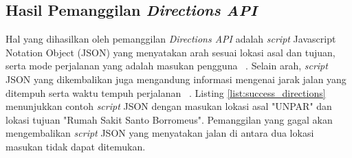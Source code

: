 \begin{table}[h]
\begin{tabular}{|p{5cm}|p{6cm}|p{5cm}|}
	\end{tabular}
\end{table}


\subsection{Hasil Pemanggilan \textit{Directions API}}
Hal yang dihasilkan oleh pemanggilan \textit{Directions API} adalah \textit{script} Javascript Notation Object (JSON) yang menyatakan arah sesuai lokasi asal dan tujuan, serta mode perjalanan yang adalah masukan pengguna ~\cite{directions-api}. Selain arah, \textit{script} JSON yang dikembalikan juga mengandung informasi mengenai jarak jalan yang ditempuh serta waktu tempuh perjalanan ~\cite{directions-api}. Listing \ref{list:success_directions} menunjukkan contoh \textit{script} JSON dengan masukan lokasi asal "UNPAR" dan lokasi tujuan "Rumah Sakit Santo Borromeus". Pemanggilan yang gagal akan mengembalikan \textit{script} JSON yang menyatakan jalan di antara dua lokasi masukan tidak dapat ditemukan.


